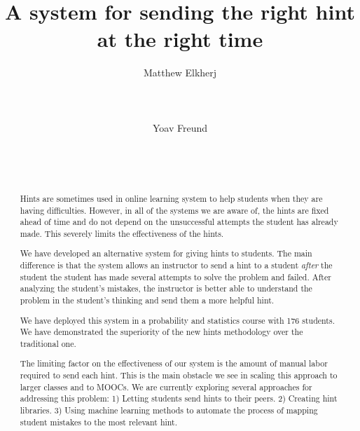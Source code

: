 \documentclass{sigchi}
\begin{document}
\title{A system for sending the right hint at the right time}

\author{
  \alignauthor Matthew Elkherj\\
    \\
    \\
    \\
  \alignauthor Yoav Freund\\
    \\
    \\
    \\
}

\maketitle

\begin{abstract}
Hints are sometimes used in online learning system to help students
when they are having difficulties. However, in all of the systems we
are aware of, the hints are fixed ahead of time and do not depend on
the unsuccessful attempts the student has already made. This severely
limits the effectiveness of the hints.

We have developed an alternative system for giving hints to
students. The main difference is that the system allows an instructor
to send a hint to a student {\em after} the student the student has
made several attempts to solve the problem and failed.  After
analyzing the student's mistakes, the instructor is better able to
understand the problem in the student's thinking and send them a more
helpful hint.

We have deployed this system in a probability and statistics course
with 176 students. We have demonstrated the superiority of the new
hints methodology over the traditional one.

The limiting factor on the effectiveness of our system is the amount
of manual labor required to send each hint. This is the main obstacle
we see in scaling this approach to larger classes and to MOOCs. We
are currently exploring several approaches for addressing this
problem: 1) Letting students send hints to their peers. 2) Creating
hint libraries. 3) Using machine learning methods to automate
the process of mapping student mistakes to the most relevant hint.

\end{abstract}
\end{document}
